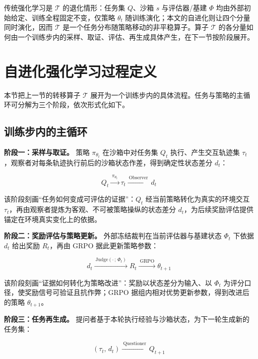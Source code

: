 传统强化学习是 $\mathcal{T}$ 的退化情形：任务集 $Q$、沙箱 $s$ 与评估器/基建 $\Phi$ 均由外部初始给定、训练全程固定不变，仅策略 $\theta_t$ 随训练演化；本文的自进化则让四个分量同时演化，因而 $\mathcal{T}$ 是一个任务分布随策略移动的非平稳算子。算子 $\mathcal{T}$ 的各分量如何由一个训练步内的采样、取证、评估、再生成具体产生，在下一节按阶段展开。

\section{自进化强化学习过程定义}
\label{sec:evolution_process}

本节把上一节的转移算子 $\mathcal{T}$ 展开为一个训练步内的具体流程。任务与策略的主循环可分解为三个阶段，依次形式化如下。

\subsection{训练步内的主循环}

\textbf{阶段一：采样与取证。} 策略 $\pi_{\theta_t}$ 在沙箱中对任务集 $Q_t$ 执行、产生交互轨迹集 $\tau_t$，观察者对每条轨迹执行前后的沙箱状态作差，得到确定性状态差分 $d_t$：

\begin{equation}
Q_t \xrightarrow{\ \pi_{\theta_t}\ } \tau_t \xrightarrow{\ \text{Observer}\ } d_t
\label{eq:mainloop_sample}
\end{equation}

该阶段刻画“任务如何变成可评估的证据”：$Q_t$ 经当前策略转化为真实的环境交互 $\tau_t$，再由观察者提炼为客观、不可被策略操纵的状态差分 $d_t$，为后续奖励评估提供锚定在环境真实变化上的依据。

\textbf{阶段二：奖励评估与策略更新。} 外部冻结裁判在当前评估器与基建状态 $\Phi_t$ 下依据 $d_t$ 给出奖励 $R_t$，再由 GRPO 据此更新策略参数：

\begin{equation}
d_t \xrightarrow{\ \text{Judge}(\cdot\,;\,\Phi_t)\ } R_t \xrightarrow{\ \text{GRPO}\ } \theta_{t+1}
\label{eq:mainloop_update}
\end{equation}

该阶段刻画“证据如何转化为策略改进”：奖励以状态差分为输入、以 $\Phi_t$ 为评分口径，使奖励信号可验证且抗作弊；GRPO 据组内相对优势更新参数，得到改进后的策略 $\theta_{t+1}$。

\textbf{阶段三：任务再生成。} 提问者基于本轮执行经验与沙箱状态，为下一轮生成新的任务集：

\begin{equation}
(\tau_t,\, d_t) \xrightarrow{\ \text{Questioner}\ } Q_{t+1}
\label{eq:mainloop_regen}
\end{equation}

